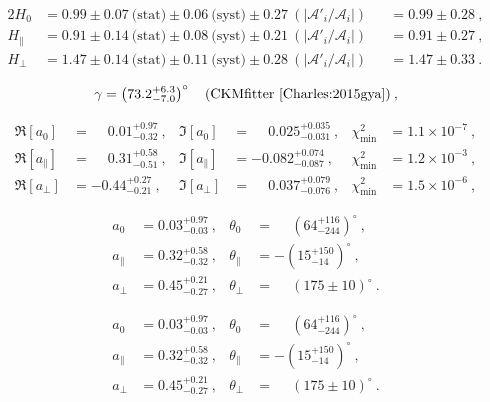 

\begin{alignat}{2}
H_0 & = 0.99 \pm 0.07\:\text{(stat)} \pm 0.06\:\text{(syst)} \pm 0.27\:(|\mathcal{A}'_i/\mathcal{A}_i|) && = 0.99 \pm 0.28\:,\\
H_\parallel & = 0.91 \pm 0.14\:\text{(stat)} \pm 0.08\:\text{(syst)} \pm 0.21\:(|\mathcal{A}'_i/\mathcal{A}_i|) && = 0.91 \pm 0.27\:,\\
H_\perp & = 1.47 \pm 0.14\:\text{(stat)} \pm 0.11\:\text{(syst)} \pm 0.28\:(|\mathcal{A}'_i/\mathcal{A}_i|) && = 1.47 \pm 0.33\:.
\end{alignat}

\begin{equation}\label{Eq:Gamma_GC}
\gamma  = \left(73.2_{-7.0}^{+6.3}\right)^{\circ} \quad\text{(CKMfitter \cite{Charles:2015gya})}\:,
\end{equation}

\begin{align}
\Re[a_0] & = \phantom{-}0.01_{-0.32}^{+0.97}\:, & \Im[a_0] & = \phantom{-}0.025_{-0.031}^{+0.035}\:, & \chi^2_{\text{min}} & = 1.1 \times 10^{-7}\:,\label{Eq:Pen_Re_Im_Long}\\
%
\Re[a_\parallel] & = \phantom{-}0.31_{-0.51}^{+0.58}\:, & \Im[a_\parallel] & = -0.082_{-0.087}^{+0.074}\:,& \chi^2_{\text{min}} & = 1.2 \times 10^{-3}\:,\label{Eq:Pen_Re_Im_Para}\\
%
\Re[a_\perp] & = -0.44_{-0.21}^{+0.27}\:, & \Im[a_\perp] & = \phantom{-}0.037_{-0.076}^{+0.079}\:,& \chi^2_{\text{min}} & = 1.5 \times 10^{-6}\:,\label{Eq:Pen_Re_Im_Perp}
\end{align}

\begin{align}
a_0 & = 0.03^{+0.97}_{-0.03}\:, & \theta_0 & = \phantom{-}\left(64^{+116}_{-244}\right)^{\circ}\:,\\
%
a_\parallel & = 0.32^{+0.58}_{-0.32}\:, & \theta_\parallel & = -\left(15^{+150}_{-14}\right)^{\circ}\:,\\
%
a_\perp & = 0.45^{+0.21}_{-0.27}\:, & \theta_\perp & = \phantom{-}\left(175 \pm 10\right)^{\circ}\:.
\end{align}

\begin{align}
a_0 & = 0.03^{+0.97}_{-0.03}\:, & \theta_0 & = \phantom{-}\left(64^{+116}_{-244}\right)^{\circ}\:,\\
%
a_\parallel & = 0.32^{+0.58}_{-0.32}\:, & \theta_\parallel & = -\left(15^{+150}_{-14}\right)^{\circ}\:,\\
%
a_\perp & = 0.45^{+0.21}_{-0.27}\:, & \theta_\perp & = \phantom{-}\left(175 \pm 10\right)^{\circ}\:.
\end{align}


